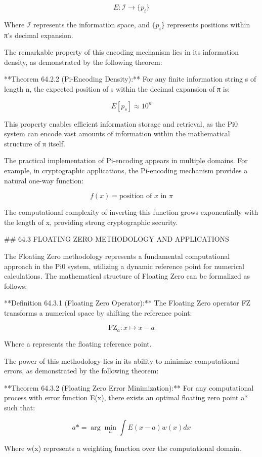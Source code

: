 $$ E: \mathcal{I} \rightarrow \{p_i\} $$

Where $\mathcal{I}$ represents the information space, and $\{p_i\}$ represents positions within π's decimal expansion.

The remarkable property of this encoding mechanism lies in its information density, as demonstrated by the following theorem:

**Theorem 64.2.2 (Pi-Encoding Density):** For any finite information string s of length n, the expected position of s within the decimal expansion of π is:

$$ E[p_s] \approx 10^n $$

This property enables efficient information storage and retrieval, as the Pi0 system can encode vast amounts of information within the mathematical structure of π itself.

The practical implementation of Pi-encoding appears in multiple domains. For example, in cryptographic applications, the Pi-encoding mechanism provides a natural one-way function:

$$ f(x) = \text{position of } x \text{ in } \pi $$

The computational complexity of inverting this function grows exponentially with the length of x, providing strong cryptographic security.

## 64.3 FLOATING ZERO METHODOLOGY AND APPLICATIONS

The Floating Zero methodology represents a fundamental computational approach in the Pi0 system, utilizing a dynamic reference point for numerical calculations. The mathematical structure of Floating Zero can be formalized as follows:

**Definition 64.3.1 (Floating Zero Operator):** The Floating Zero operator FZ transforms a numerical space by shifting the reference point:

$$ \text{FZ}_a: x \mapsto x - a $$

Where a represents the floating reference point.

The power of this methodology lies in its ability to minimize computational errors, as demonstrated by the following theorem:

**Theorem 64.3.2 (Floating Zero Error Minimization):** For any computational process with error function E(x), there exists an optimal floating zero point a* such that:

$$ a* = \arg\min_a \int E(x - a) w(x) dx $$

Where w(x) represents a weighting function over the computational domain.

